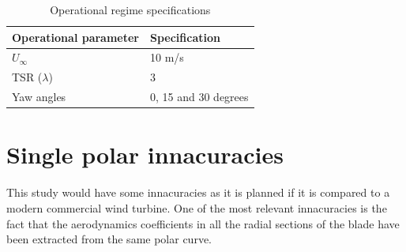 \begin{table}
\centering
\caption{Operational regime specifications}
\begin{tabular}{|l|l|} 
\hline
\textbf{Operational parameter} & \textbf{Specification}  \\ 
\hline
$U_{\infty}$                    & 10 m/s                  \\ 
\hline
TSR  ($\lambda$)                   & 3                       \\ 
\hline
Yaw angles                     & 0, 15 and 30 degrees    \\
\hline
\end{tabular}
\label{Op_specs}
\end{table}


\section{Single polar innacuracies}

This study would have some innacuracies as it is planned if it is compared to a modern commercial wind turbine. One of the most relevant innacuracies is the fact that the aerodynamics coefficients in all the radial sections of the blade have been extracted from the same polar curve. \\

